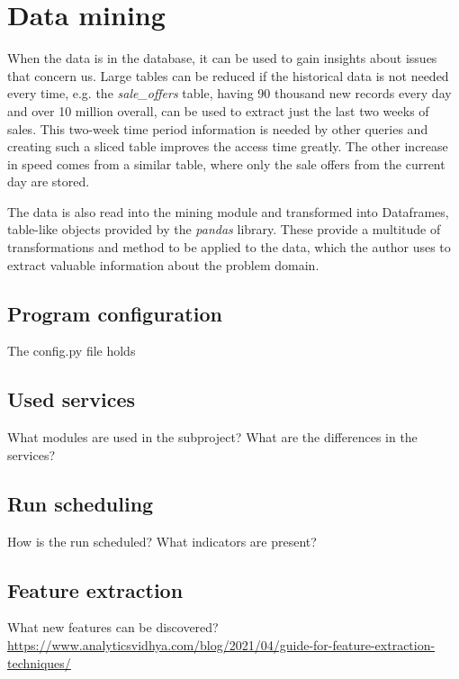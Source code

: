 \section{Data mining}
When the data is in the database, it can be used to gain insights about issues that concern us. Large tables can be reduced if the historical data is not needed every time, e.g. the \textit{sale\_offers} table, having 90 thousand new records every day and over 10 million overall, can be used to extract just the last two weeks of sales. This two-week time period information is needed by other queries and creating such a sliced table improves the access time greatly. The other increase in speed comes from a similar table, where only the sale offers from the current day are stored. \par
The data is also read into the mining module and transformed into Dataframes, table-like objects provided by the \textit{pandas} library. These provide a multitude of transformations and method to be applied to the data, which the author uses to extract valuable information about the problem domain.


\subsection{Program configuration}
The config.py file holds


\subsection{Used services}
What modules are used in the subproject?
What are the differences in the services?

\subsection{Run scheduling}
How is the run scheduled? What indicators are present?

\subsection{Feature extraction}
What new features can be discovered?
\url{https://www.analyticsvidhya.com/blog/2021/04/guide-for-feature-extraction-techniques/}